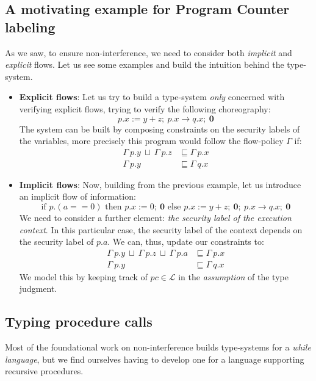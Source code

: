 \documentclass[12pt,a4paper,twoside]{book}
\begin{document}
\subsection{A motivating example for Program Counter labeling}
As we saw, to ensure non-interference, we need to consider both \textit{implicit} and \textit{explicit} flows.
Let us see some examples and build the intuition behind the type-system.
\begin{itemize}
	\item{\textbf{Explicit flows}}: Let us try to build a type-system \textit{only} concerned with verifying explicit flows, trying to verify the following choreography:
$$ p.x := y + z; ~ p.x \rightarrow q.x; ~ \boldsymbol{0} $$
	The system can be built by composing constraints on the security labels of the variables, more precisely this program would follow the flow-policy $\Gamma$ if:
	\begin{align*}
		\Gamma~p.y ~\sqcup~ \Gamma~p.z &\sqsubseteq \Gamma~p.x\\
		\Gamma~p.y &\sqsubseteq \Gamma~q.x
	\end{align*}
	\item{\textbf{Implicit flows}}: Now, building from the previous example, let us introduce an implicit flow of information:
	$$ \text{if } p.(a == 0) \text{ then } p.x := 0; ~ \boldsymbol{0} \text{ else } p.x := y + z; ~ \boldsymbol{0}; ~ p.x \rightarrow q.x; ~ \boldsymbol{0} $$
	We need to consider a further element: \textit{the security label of the execution context}. In this particular case, the security label of the context depends on the security label of $p.a$. We can, thus, update our constraints to:
	\begin{align*}
		\Gamma~p.y~\sqcup~\Gamma~p.z~\sqcup~\Gamma~p.a &\sqsubseteq \Gamma~p.x\\
		\Gamma~p.y &\sqsubseteq \Gamma~q.x
	\end{align*}
	We model this by keeping track of $pc \in \mathscr{L}$ in the \textit{assumption} of the type judgment.
\end{itemize}

\subsection{Typing procedure calls}
Most of the foundational work on non-interference\cite{sabelfeld2003language} builds type-systems for a \textit{while language}, but we find ourselves having to develop one for a language supporting recursive procedures.
\end{document}
